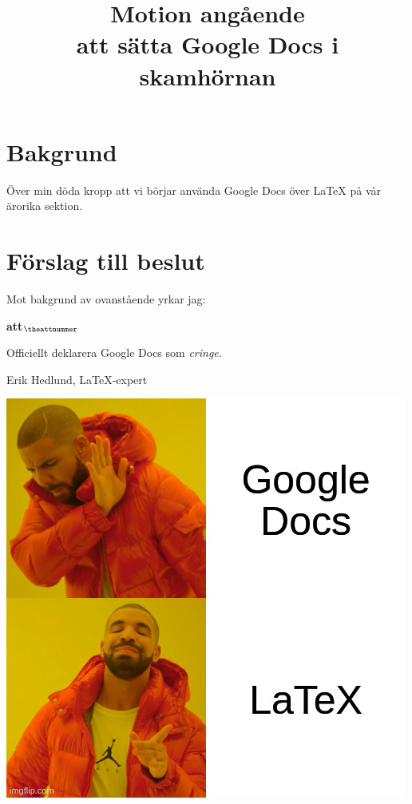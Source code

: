 \documentclass[a4paper]{article}
\title{\textcolor{cerise}{\textbf{
    Motion angående\\
    att sätta Google Docs i skamhörnan
}}}
\date{}
\begin{document}
\maketitle
\thispagestyle{fancy} %

\section*{\textcolor{cerise}{
    Bakgrund
}}

Över min döda kropp att vi börjar använda Google Docs över \LaTeX{} på vår ärorika sektion.

\section*{\textcolor{cerise}{
    Förslag till beslut
}}

	Mot bakgrund av ovanstående yrkar jag:

\setcounter{attnummer}{1}
\begin{list}{\bf att$_{\theattnummer}$}{}
\item Officiellt deklarera Google Docs som \textit{cringe}.
\end{list}

\vspace{2cm}
\noindent
Erik Hedlund, \LaTeX{}-expert
\begin{center}
\includegraphics[scale=0.5]{./meme.jpg}
\end{center}
\end{document}
